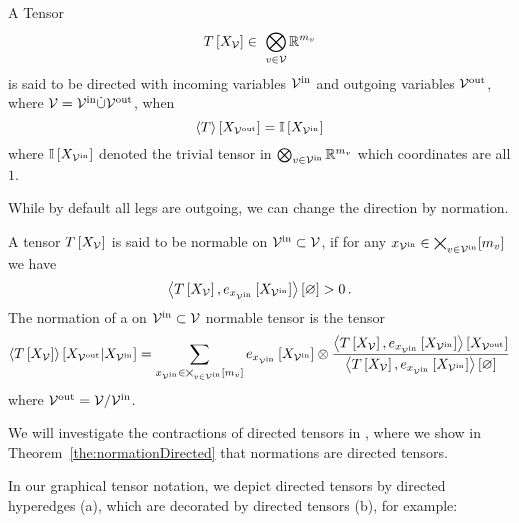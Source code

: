 \begin{definition}\label{def:directedTensor}
	A Tensor
		\[ \hypercoreat{\nodevariables} \in \bigotimes_{\nodein}\rr^{\catdimof{\node}} \]
	is said to be directed with incoming variables $\mathcal{V}^{\mathrm{in}}$ and outgoing variables $\mathcal{V}^{\mathrm{out}}$, where $\mathcal{V}=\mathcal{V}^{\mathrm{in}}\dot{\cup}\mathcal{V}^{\mathrm{out}}$, when
		\[ \left\langle T\right\rangle \left[ X_{\mathcal{V}^{\mathrm{out}}} \right] =  \mathbb{I}\left[X_{\mathcal{V}^{\mathrm{in}}}\right] \]
	where $\mathbb{I}\left[X_{\mathcal{V}^{\mathrm{in}}}\right]$ denoted the trivial tensor in  $\bigotimes_{v\in\mathcal{V}^{\mathrm{in}}}\mathbb{R}^{m_{v}}$ which coordinates are all $1$.
\end{definition}

While by default all legs are outgoing, we can change the direction by normation.

\begin{definition}\label{def:normation}
	A tensor $T\left[X_{\mathcal{V}}\right]$ is said to be normable on $\mathcal{V}^{\mathrm{in}}\subset\mathcal{V}$, if for any $x_{\mathcal{V}^{\mathrm{in}}}\in\bigtimes_{v\in\mathcal{V}^{\mathrm{in}}}[m_{v}]$ we have
		\[ \left\langle T\left[X_{\mathcal{V}}\right],e_{x_{\mathcal{V}^{\mathrm{in}}}}\left[X_{\mathcal{V}^{\mathrm{in}}}\right]\right\rangle \left[ \varnothing \right] > 0 \, . \]
	The normation of a on $\mathcal{V}^{\mathrm{in}}\subset\mathcal{V}$ normable tensor is the tensor
	\begin{align*}
		\left\langle T\left[X_{\mathcal{V}}\right]\right\rangle \left[ X_{\mathcal{V}^{\mathrm{out}}} | X_{\mathcal{V}^{\mathrm{in}}} \right] =
		\sum_{x_{\mathcal{V}^{\mathrm{in}}}\in\bigtimes_{v\in\mathcal{V}^{\mathrm{in}}}[m_{v}]}
		e_{x_{\mathcal{V}^{\mathrm{in}}}}\left[X_{\mathcal{V}^{\mathrm{in}}}\right] \otimes \frac{
		\left\langle T\left[X_{\mathcal{V}}\right],e_{x_{\mathcal{V}^{\mathrm{in}}}}\left[X_{\mathcal{V}^{\mathrm{in}}}\right]\right\rangle \left[ X_{\mathcal{V}^{\mathrm{out}}} \right]
		}{
		\left\langle T\left[X_{\mathcal{V}}\right],e_{x_{\mathcal{V}^{\mathrm{in}}}}\left[X_{\mathcal{V}^{\mathrm{in}}}\right]\right\rangle \left[ \varnothing \right]
		}
	\end{align*}
	where $\mathcal{V}^{\mathrm{out}} = \mathcal{V}/\mathcal{V}^{\mathrm{in}}$.
\end{definition}

We will investigate the contractions of directed tensors in , where we show in Theorem~\ref{the:normationDirected} that normations are directed tensors.


In our graphical tensor notation, we depict directed tensors by directed hyperedges (a), which are decorated by directed tensors (b), for example:
	\begin{center}
		
	\end{center}



